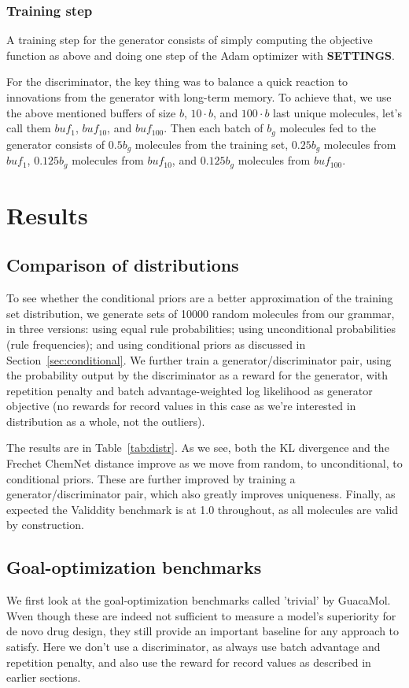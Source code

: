 \documentclass{article}
\begin{document}
\subsubsection{Training step}
A training step for the generator consists of simply computing the objective function as above and doing one step of the Adam optimizer with {\bf SETTINGS}. 

For the discriminator, the key thing was to balance a quick reaction to innovations from the generator with long-term memory. To achieve that, we use the above mentioned buffers of size $b$, $10\cdot b$, and $100\cdot b$ last unique molecules, let's call them $buf_1$, $buf_{10}$, and $buf_{100}$. Then each batch of $b_g$ molecules fed to the generator consists of $0.5 b_g$ molecules from the training set, $0.25 b_g$ molecules from $buf_1$,  $0.125 b_g$ molecules from $buf_{10}$, and  $0.125 b_g$ molecules from $buf_{100}$. 

\section{Results}\label{sec:results}
\subsection{Comparison of distributions}
To see whether the conditional priors are a better approximation of the training set distribution, we generate sets of 10000 random molecules from our grammar, in three versions: using equal rule probabilities; using unconditional probabilities (rule frequencies); and using conditional priors as discussed in Section~\ref{sec:conditional}. We further train a generator/discriminator pair, using the probability output by the discriminator as a reward for the generator, with repetition penalty and batch advantage-weighted log likelihood as generator objective (no rewards for record values in this case as we're interested in distribution as a whole, not the outliers). 

The results are in Table~\ref{tab:distr}. As we see, both the KL divergence and the Frechet ChemNet distance improve as we move from random, to unconditional, to conditional priors. These are further improved by training a generator/discriminator pair, which also greatly improves uniqueness. Finally, as expected the Validdity benchmark is at 1.0 throughout, as all molecules are valid by construction.

\subsection{Goal-optimization benchmarks}
We first look at the goal-optimization benchmarks called 'trivial' by GuacaMol. Wven though these are indeed not sufficient to measure a model's superiority for de novo drug design, they still provide an important baseline for any approach to satisfy. 
Here we don't use a discriminator, as always use batch advantage and repetition penalty, and also use the reward for record values as described in earlier sections.
\end{document}
